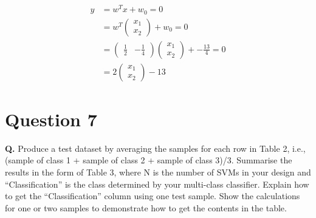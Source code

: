 \documentclass[12pt]{report}
\begin{document}
\begin{equation}
	\begin{aligned}
		y & = w^Tx + w_{0} = 0                                                                                                    \\
		  & = w^T\begin{pmatrix}x_{1}\\x_{2}\end{pmatrix} + w_{0} = 0                                                             \\
		  & = \begin{pmatrix}\frac{1}{2} & -\frac{1}{4}\end{pmatrix}\begin{pmatrix}x_{1} \\x_{2}\end{pmatrix} + -\frac{13}{4} = 0 \\
		  & = 2\begin{pmatrix}x_{1}\\x_{2}\end{pmatrix} - 13
	\end{aligned}
\end{equation}

\pagebreak

\section{Question 7}

\textbf{Q.} Produce a test dataset by averaging the samples for each row in Table 2, i.e., (sample of class 1 + sample of class 2 + sample of class 3)/3. Summarise the results in
the form of Table 3, where N is the number of SVMs in your design and “Classification” is the class determined by your multi-class classifier. Explain how to get
the “Classification” column using one test sample. Show the calculations for one or
two samples to demonstrate how to get the contents in the table.
\end{document}
